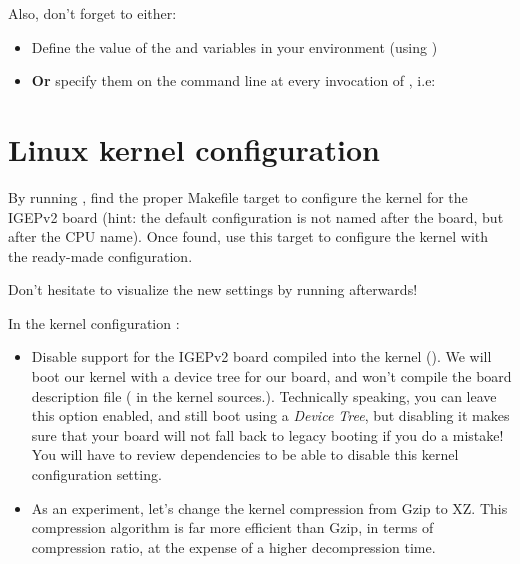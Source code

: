 Also, don't forget to either:

\begin{itemize}
\item Define the value of the  and 
  variables in your environment (using )
\item {\bf Or} specify them on the command line at every invocation of
  , i.e: 
\end{itemize}

\section{Linux kernel configuration}

By running , find the proper Makefile target to
configure the kernel for the IGEPv2 board (hint: the default
configuration is not named after the board, but after the CPU
name). Once found, use this target to configure the kernel with the
ready-made configuration.

Don't hesitate to visualize the new settings by running
 afterwards!

In the kernel configuration :

\begin{itemize}


\item Disable support for the IGEPv2 board compiled into the kernel
  (). We will boot our kernel with a device
  tree for our board, and won't compile the board description file
  ( in the kernel
  sources.). Technically speaking, you can leave this option enabled,
  and still boot using a {\em Device Tree}, but disabling it makes
  sure that your board will not fall back to legacy booting if you do
  a mistake! You will have to review dependencies to be able to
  disable this kernel configuration setting.
\item As an experiment, let's change the kernel compression from Gzip
  to XZ. This compression algorithm is far more efficient than Gzip,
  in terms of compression ratio, at the expense of a higher
  decompression time.
\end{itemize}

